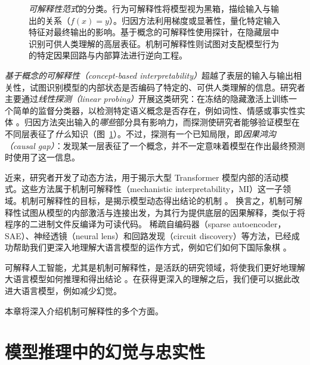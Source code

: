 \begin{figure}[!ht]
  \begin{center}
    
    \caption{\emph{可解释性范式}的分类。行为可解释性将模型视为黑箱，描绘输入与输出的关系（$f(x) = y$）。归因方法利用梯度或显著性，量化特定输入特征对最终输出的影响。基于概念的可解释性使用探针，在隐藏层中识别可供人类理解的高层表征。机制可解释性则试图对支配模型行为的特定因果回路与内部算法进行逆向工程。\label{fig:MIconcepts}}
  \end{center}
\end{figure}

\emph{基于概念的可解释性（concept-based interpretability）}超越了表层的输入与输出相关性，试图识别模型的内部状态是否编码了特定的、可供人类理解的信息。研究者主要通过\emph{线性探测（linear probing）}开展这类研究：在冻结的隐藏激活上训练一个简单的监督分类器，以检测特定语义概念是否存在，例如词性、情感或事实性实体 \citep{alain2016understanding, belinkov2022probing}。归因方法突出输入的\textit{哪些}部分具有影响力，而探测使研究者能够验证模型在不同层表征了\textit{什么}知识（图~\ref{fig:MIconcepts}）。不过，探测有一个已知局限，即{\em 因果鸿沟（causal gap）}：发现某一层表征了一个概念，并不一定意味着模型在作出最终预测时使用了这一信息。

近来，研究者开发了动态方法，用于揭示大型 Transformer 模型内部的活动模式。这些方法属于机制可解释性（mechanistic interpretability，MI）这一子领域。机制可解释性的目标，是揭示模型动态得出结论的机制 \citep{nanda2023progress,bereska2024mechanistic,ferrando2024primer,rai2024practical}。
换言之，机制可解释性试图从模型的内部激活与连接出发，为其行为提供底层的因果解释，类似于将程序的二进制文件反编译为可读代码。
稀疏自编码器（sparse autoencoder，SAE）\citep{cunningham2023sparse,makelov2024towards}、神经透镜（neural lens）\citep{black2022interpreting}和回路发现（circuit discovery）\citep{conmy2023towards}等方法，已经成功帮助我们更深入地理解大语言模型的运作方式，例如它们如何下国际象棋 \citep{davis2024decoding}。

可解释人工智能，尤其是机制可解释性，是活跃的研究领域，将使我们更好地理解大语言模型如何推理和得出结论 \citep{sharkey2025open}。在获得更深入的理解之后，我们便可以据此改进大语言模型，例如减少幻觉。

本章将深入介绍机制可解释性的多个方面。

\section{模型推理中的幻觉与忠实性}

